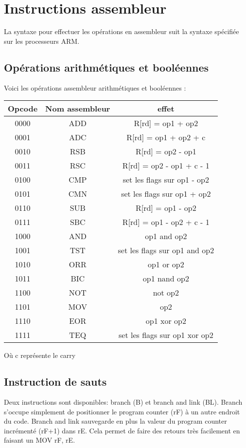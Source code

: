 \documentclass[a4paper]{article}
\begin{document}
\section{Instructions assembleur}

La syntaxe pour effectuer les opérations en assembleur suit la syntaxe spécifiée
sur les processeurs ARM.

\subsection{Opérations arithmétiques et booléennes}

Voici les opérations assembleur arithmétiques et booléennes :\\

\begin{tabular}{|c|c|c|}
  \hline
  Opcode & Nom assembleur & effet \\
  \hline
  0000 & ADD & R[rd] = op1 + op2\\
  0001 & ADC & R[rd] = op1 + op2 + c\\
  0010 & RSB & R[rd] = op2 - op1\\
  0011 & RSC & R[rd] = op2 - op1 + c - 1\\
  0100 & CMP & set les flags sur op1 - op2\\
  0101 & CMN & set les flags sur op1 + op2\\
  0110 & SUB & R[rd] = op1 - op2 \\
  0111 & SBC & R[rd] = op1 - op2 + c - 1\\
  1000 & AND & op1 and op2\\
  1001 & TST & set les flags sur op1 and op2\\
  1010 & ORR & op1 or op2\\
  1011 & BIC & op1 nand op2\\
  1100 & NOT & not op2\\
  1101 & MOV & op2\\
  1110 & EOR & op1 xor op2\\
  1111 & TEQ & set les flags sur op1 xor op2\\
  \hline
\end{tabular}

Où c représente le carry

\subsection{Instruction de sauts}
Deux instructions sont disponibles: branch (B) et branch and link (BL).
Branch s'occupe simplement de positionner le program counter (rF) à un autre
endroit du code. Branch and link sauvegarde en plus la valeur du program counter
incrémenté (rF+1) dans rE. Cela permet de faire des retours très facilement en
faisant un MOV rF, rE.
\end{document}
